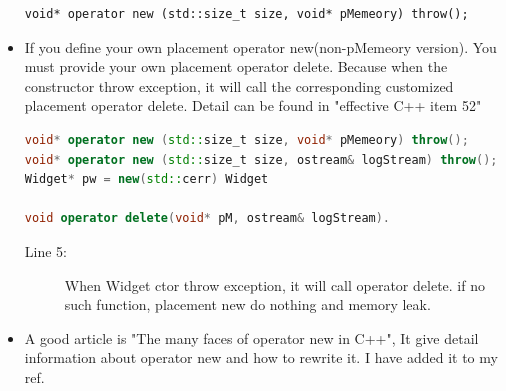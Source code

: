 \documentclass[a4paper,11pt,twoside]{book}
\begin{document}
\begin{itemize}
\begin{lstlisting}[numbers=none]
void* operator new (std::size_t size, void* pMemeory) throw();
\end{lstlisting}
	
	\item If you define your own placement operator new(non-pMemeory version). You must provide your own placement operator delete. Because when the constructor throw exception, it will call the corresponding customized placement operator delete. Detail can be found in "effective C++ item 52"
\begin{lstlisting}[frame=single, language=c++]
void* operator new (std::size_t size, void* pMemeory) throw();
void* operator new (std::size_t size, ostream& logStream) throw();
Widget* pw = new(std::cerr) Widget

void operator delete(void* pM, ostream& logStream). 
\end{lstlisting}
\begin{description}
	\item[Line 5:] When Widget ctor throw exception, it will call operator delete. if no such function, placement new do nothing and memory leak.
\end{description}
	
	\item A good article is "The many faces of operator new in C++", It give  detail information about operator new and how to rewrite it. I have added it to my ref.
\end{itemize}
\end{document}
